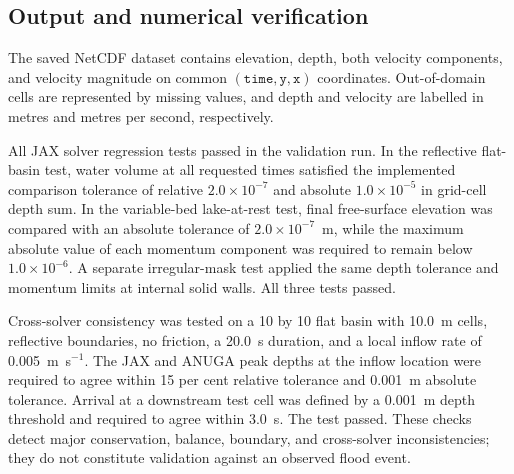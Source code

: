 \subsection{Output and numerical verification}

The saved NetCDF dataset contains elevation, depth, both velocity components,
and velocity magnitude on common \((\texttt{time},\texttt{y},\texttt{x})\)
coordinates.  Out-of-domain cells are represented by missing values, and
depth and velocity are labelled in metres and metres per second,
respectively.

All JAX solver regression tests passed in the validation run.  In the
reflective flat-basin test, water volume at all requested times satisfied the
implemented comparison tolerance of relative \(2.0\times10^{-7}\) and absolute
\(1.0\times10^{-5}\) in grid-cell depth sum.  In the variable-bed
lake-at-rest test, final free-surface elevation was compared with an absolute
tolerance of \(2.0\times10^{-7}\)~m, while the maximum absolute value of each
momentum component was required to remain below \(1.0\times10^{-6}\).  A
separate irregular-mask test applied the same depth tolerance and momentum
limits at internal solid walls.  All three tests passed.

Cross-solver consistency was tested on a 10 by 10 flat basin with 10.0~m
cells, reflective boundaries, no friction, a 20.0~s duration, and a local
inflow rate of 0.005~m~s\(^{-1}\).  The JAX and ANUGA peak depths at the
inflow location were required to agree within 15 per cent relative tolerance
and 0.001~m absolute tolerance.  Arrival at a downstream test cell was defined
by a 0.001~m depth threshold and required to agree within 3.0~s.  The test
passed.  These checks detect major conservation, balance, boundary, and
cross-solver inconsistencies; they do not constitute validation against an
observed flood event.
